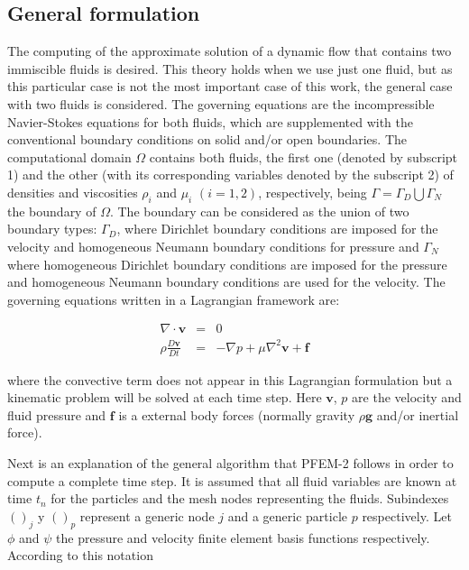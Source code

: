 \subsection{General formulation}\label{GeneralFor}
The computing of the approximate solution of a dynamic flow that contains two immiscible fluids is desired. This theory holds when we use just one fluid, but as this particular case is not the most important case of this work, the general case with two fluids is considered. The governing equations are the incompressible Navier-Stokes equations for both fluids, which are supplemented with the conventional boundary conditions on solid and/or open boundaries. The computational domain $\Omega$ contains both fluids, the first one (denoted by subscript 1) and the other (with its corresponding variables denoted by the subscript 2) of densities and viscosities $\rho_i$ and $\mu_i$ $(i=1,2)$, respectively, being $\Gamma=\Gamma_D\bigcup\Gamma_N$ the boundary of $\Omega$. The boundary can be considered as the union of two boundary types: $\Gamma_D$, where Dirichlet boundary conditions are imposed for the velocity and homogeneous Neumann boundary conditions for pressure and $\Gamma_N$ where homogeneous Dirichlet boundary conditions are imposed for the pressure and homogeneous Neumann boundary conditions are used for the velocity. The governing equations written in a Lagrangian framework are:

\begin{eqnarray}
  \nabla \cdot \mathbf{v} &=& 0 \\
  \rho\frac{D\mathbf{v}}{Dt} &=& -\nabla p + \mu \nabla^2 \mathbf{v} + \mathbf{f}
\end{eqnarray}

where the convective term does not appear in this Lagrangian formulation but a kinematic problem will be solved at each time step. Here $\mathbf{v}$, $p$ are the velocity and fluid pressure and $\mathbf{f}$ is a external body forces (normally gravity $\rho \mathbf{g}$ and/or inertial force).

Next is an explanation of the general algorithm that PFEM-2 follows in order to compute a complete time step. It is assumed that all fluid variables are known at time $t_n$ for the particles and the mesh nodes representing the fluids. Subindexes $()_j$ y $()_p$ represent a generic node $j$ and a generic particle $p$ respectively. Let $\phi$ and $\psi$ the pressure and velocity finite element basis functions respectively. According to this notation

